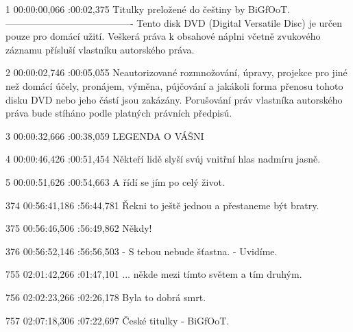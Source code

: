 \begin{subexam}
1
00:00:00,066 :00:02,375
Titulky preložené do češtiny by BiGfOoT.
----------------------------------------
Tento disk DVD (Digital Versatile Disc)
je určen pouze pro domácí užití.
Veškerá práva k obsahové náplni včetně
zvukového záznamu přísluší vlastníku
autorského práva.

2
00:00:02,746 :00:05,055
Neautorizované rozmnožování,
úpravy, projekce pro jiné než domácí
účely, pronájem, výměna, pújčování a
jakákoli forma přenosu tohoto disku
DVD nebo jeho částí jsou zakázány.
Porušování práv vlastníka autorského
práva bude stíháno podle platných
právních předpisú.

3
00:00:32,666 :00:38,059
LEGENDA O VÁŠNI

4
00:00:46,426 :00:51,454
Někteří lidě slyší svúj
vnitřní hlas nadmíru jasně.

5
00:00:51,626 :00:54,663
A řídí se jím po celý život.

374
00:56:41,186 :56:44,781
Řekni to ještě jednou
a přestaneme být bratry.

375
00:56:46,506 :56:49,862
Někdy!

376
00:56:52,146 :56:56,503
- S tebou nebude šťastna.
- Uvidíme.

755
02:01:42,266 :01:47,101
... někde mezi tímto světem
a tím druhým.

756
02:02:23,266 :02:26,178
Byla to dobrá smrt.

757
02:07:18,306 :07:22,697
České titulky - BiGfOoT.
\end{subexam}
\hspace{0.5cm}
